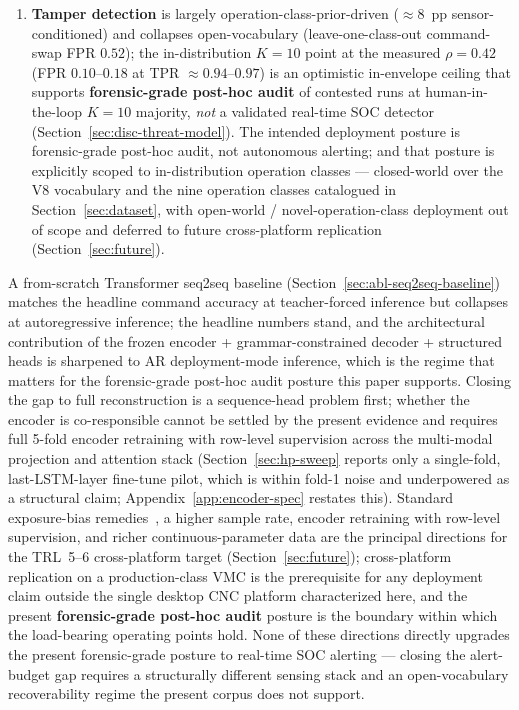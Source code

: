 \documentclass[sensors,article,submit,moreauthors,pdftex]{Definitions/mdpi}
\begin{document}
\begin{enumerate}[label=(\arabic*), leftmargin=*, nosep]
\item \textbf{Tamper detection} is largely operation-class-prior-driven ($\approx\!8$~pp sensor-conditioned) and collapses open-vocabulary (leave-one-class-out command-swap FPR $0.52$); the in-distribution $K\!=\!10$ point at the measured $\rho\!=\!0.42$ (FPR $0.10$--$0.18$ at TPR $\approx\!0.94$--$0.97$) is an optimistic in-envelope ceiling that supports \textbf{forensic-grade post-hoc audit} of contested runs at human-in-the-loop $K\!=\!10$ majority, \emph{not} a validated real-time SOC detector (Section~\ref{sec:disc-threat-model}). The intended deployment posture is forensic-grade post-hoc audit, not autonomous alerting; and that posture is explicitly scoped to in-distribution operation classes --- closed-world over the V8 vocabulary and the nine operation classes catalogued in Section~\ref{sec:dataset}, with open-world / novel-operation-class deployment out of scope and deferred to future cross-platform replication (Section~\ref{sec:future}).
\end{enumerate}

A from-scratch Transformer seq2seq baseline (Section~\ref{sec:abl-seq2seq-baseline}) matches the headline command accuracy at teacher-forced inference but collapses at autoregressive inference; the headline numbers stand, and the architectural contribution of the frozen encoder + grammar-constrained decoder + structured heads is sharpened to AR deployment-mode inference, which is the regime that matters for the forensic-grade post-hoc audit posture this paper supports. Closing the gap to full reconstruction is a sequence-head problem first; whether the encoder is co-responsible cannot be settled by the present evidence and requires full 5-fold encoder retraining with row-level supervision across the multi-modal projection and attention stack (Section~\ref{sec:hp-sweep} reports only a single-fold, last-LSTM-layer fine-tune pilot, which is within fold-1 noise and underpowered as a structural claim; Appendix~\ref{app:encoder-spec} restates this). Standard exposure-bias remedies~\cite{he2019exposure,ott2018uncertainty,ranzato2016sequence,holtzman2020curious,welleck2020neural}, a higher sample rate, encoder retraining with row-level supervision, and richer continuous-parameter data are the principal directions for the TRL~5--6 cross-platform target (Section~\ref{sec:future}); cross-platform replication on a production-class VMC is the prerequisite for any deployment claim outside the single desktop CNC platform characterized here, and the present \textbf{forensic-grade post-hoc audit} posture is the boundary within which the load-bearing operating points hold. None of these directions directly upgrades the present forensic-grade posture to real-time SOC alerting --- closing the alert-budget gap requires a structurally different sensing stack and an open-vocabulary recoverability regime the present corpus does not support.
\end{document}
